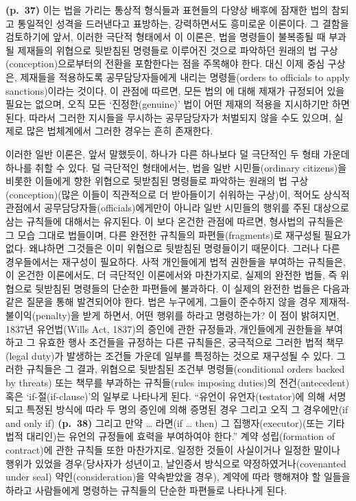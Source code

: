 \textbf{(p.~37)} 이는 법을 가리는 통상적 형식들과 표현들의 다양상 배후에
잠재한 법의 참되고 통일적인 성격을 드러낸다고 표방하는, 강력하면서도
흥미로운 이론이다. 그 결함을 검토하기에 앞서, 이러한 극단적 형태에서 이
이론은, 법을 명령들이 불복종될 때 부과될 제재들의 위협으로 뒷받침된
명령들로 이루어진 것으로 파악하던 원래의 법 구상(conception)으로부터의
전환을 포함한다는 점을 주목해야 한다. 대신 이제 중심 구상은, 제재들을
적용하도록 공무담당자들에게 내리는 명령들(orders to officials to apply
sanctions)이라는 것이다. 이 관점에 따르면, 모든 법의
에 대해 제재가 규정되어 있을 필요는 없으며, 오직 모든
‘진정한(genuine)’ 법이 어떤 제재의 적용을 지시하기만 하면 된다. 따라서
그러한 지시들을 무시하는 공무담당자가 처벌되지 않을 수도 있으며, 실제로
많은 법체계에서 그러한 경우는 흔히 존재한다.

이러한 일반 이론은, 앞서 말했듯이, 하나가 다른 하나보다 덜 극단적인 두
형태 가운데 하나를 취할 수 있다. 덜 극단적인 형태에서는, 법을 일반
시민들(ordinary citizens)을 비롯한 이들에게 향한 위협으로 뒷받침된
명령들로 파악하는 원래의 법 구상(conception)(많은 이들이 직관적으로 더
받아들이기 쉬워하는 구상)이, 적어도 상식적 관점에서
공무담당자들(officials)에게만이 아니라 일반 시민들의 행위를 주된
대상으로 삼는 규칙들에 대해서는 유지된다. 이 보다 온건한 관점에 따르면,
형사법의 규칙들은 그 모습 그대로 법들이며, 다른 완전한 규칙들의
파편들(fragments)로 재구성될 필요가 없다. 왜냐하면 그것들은 이미
위협으로 뒷받침된 명령들이기 때문이다. 그러나 다른 경우들에서는 재구성이
필요하다. 사적 개인들에게 법적 권한들을 부여하는 규칙들은, 이 온건한
이론에서도, 더 극단적인 이론에서와 마찬가지로, 실제의 완전한 법들, 즉
위협으로 뒷받침된 명령들의 단순한 파편들에 불과하다. 이 실제의 완전한
법들은 다음과 같은 질문을 통해 발견되어야 한다. 법은 누구에게, 그들이
준수하지 않을 경우 제재적-불이익(penalty)을 받게 하면서, 어떤 행위를
하라고 명령하는가? 이 점이 밝혀지면, 1837년 유언법(Wills Act, 1837)의
증인에 관한 규정들과, 개인들에게 권한들을 부여하고 그 유효한 행사
조건들을 규정하는 다른 규칙들은, 궁극적으로 그러한 법적 책무(legal
duty)가 발생하는 조건들 가운데 일부를 특정하는 것으로 재구성될 수 있다.
그러한 규칙들은 그 결과, 위협으로 뒷받침된 조건부 명령들(conditional
orders backed by threats) 또는 책무를 부과하는 규칙들(rules imposing
duties)의 전건(antecedent) 혹은 ‘if-절(if-clause)’의 일부로 나타나게
된다. “유언이 유언자(testator)에 의해 서명되고 특정된 방식에 따라 두
명의 증인에 의해 증명된 경우 그리고 오직 그 경우에만(if and only if)
\textbf{(p.~38)} 그리고 만약 \ldots{} 라면(if \ldots{} then) 그
집행자(executor)(또는 기타 법적 대리인)는 유언의 규정들에 효력을
부여하여야 한다.” 계약 성립(formation of contract)에 관한 규칙들 또한
마찬가지로, 일정한 것들이 사실이거나 일정한 말이나 행위가 있었을
경우(당사자가 성년이고, 날인증서 방식으로 약정하였거나(covenanted under
seal) 약인(consideration)을 약속받았을 경우), 계약에 따라 행해져야 할
일들을 하라고 사람들에게 명령하는 규칙들의 단순한 파편들로 나타나게
된다.

